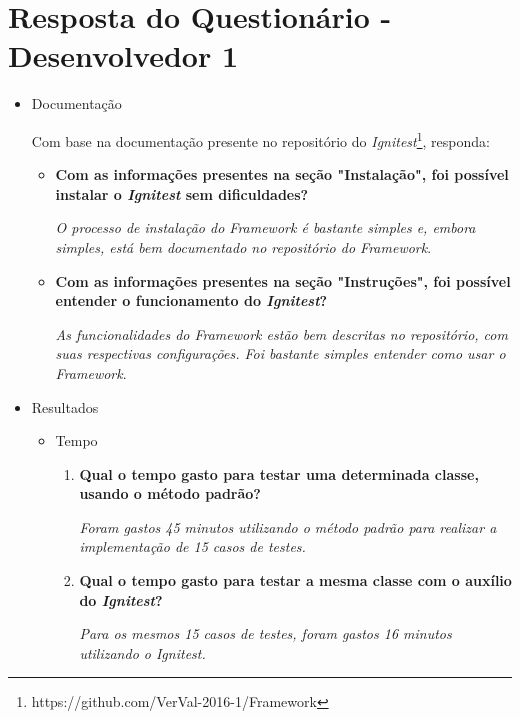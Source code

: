 \chapter{Resposta do Questionário - Desenvolvedor 1}
    
    \begin{itemize}
        \item Documentação
        
            Com base na documentação presente no repositório do \textit{Ignitest}\footnote{https://github.com/VerVal-2016-1/Framework}, responda:
            \begin{itemize}
                \item \textbf{Com as informações presentes na seção "Instalação", foi possível instalar o \textit{Ignitest} sem dificuldades?}
		    
		    \subitem \textit{O processo de instalação do Framework é bastante simples e, embora simples, está bem documentado no 
			      repositório do Framework}.
		    
                \item \textbf{Com as informações presentes na seção "Instruções", foi possível entender o funcionamento do \textit{Ignitest}?}
		     
		     \subitem \textit{As funcionalidades do Framework estão bem descritas no repositório, com suas respectivas configurações.
			      Foi bastante simples entender como usar o Framework}.
		     
            \end{itemize}
            
        \item Resultados
            \begin{itemize}
                \item Tempo
                    \begin{enumerate}
                        \item \textbf{Qual o tempo gasto para testar uma determinada classe, usando o método padrão?}
			  
			  \subitem \textit{Foram gastos 45 minutos utilizando o método padrão para realizar a implementação de 15 casos de testes.}
			  
                        \item \textbf{Qual o tempo gasto para testar a mesma classe com o auxílio do \textit{Ignitest}?}
			  
			  \subitem \textit{Para os mesmos 15 casos de testes, foram gastos 16 minutos utilizando o Ignitest.}
                        

\end{enumerate}
\end{itemize}
\end{itemize}
